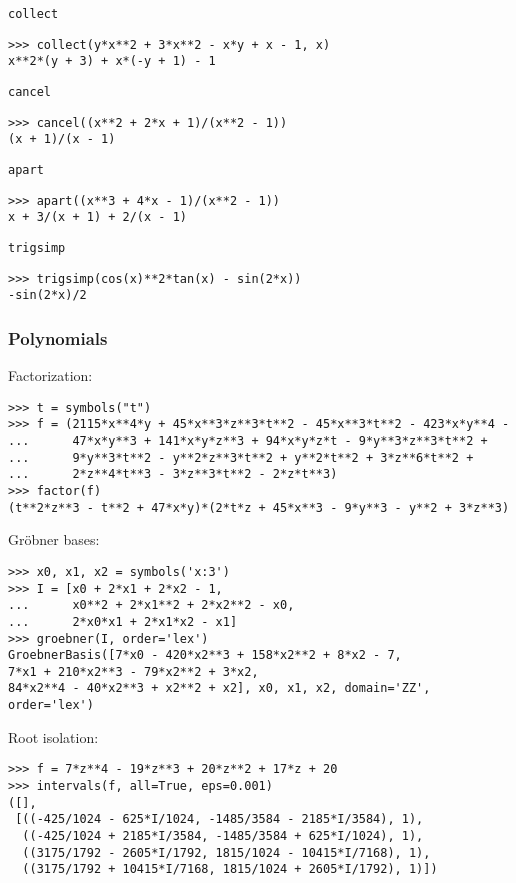 \noindent \texttt{collect}
\begin{verbatim}
>>> collect(y*x**2 + 3*x**2 - x*y + x - 1, x)
x**2*(y + 3) + x*(-y + 1) - 1
\end{verbatim}

\noindent \texttt{cancel}
\begin{verbatim}
>>> cancel((x**2 + 2*x + 1)/(x**2 - 1))
(x + 1)/(x - 1)
\end{verbatim}

\noindent \texttt{apart}
\begin{verbatim}
>>> apart((x**3 + 4*x - 1)/(x**2 - 1))
x + 3/(x + 1) + 2/(x - 1)
\end{verbatim}

\noindent \texttt{trigsimp}
\begin{verbatim}
>>> trigsimp(cos(x)**2*tan(x) - sin(2*x))
-sin(2*x)/2
\end{verbatim}


\subsubsection{Polynomials}
\noindent Factorization:
\begin{verbatim}
>>> t = symbols("t")
>>> f = (2115*x**4*y + 45*x**3*z**3*t**2 - 45*x**3*t**2 - 423*x*y**4 -
...      47*x*y**3 + 141*x*y*z**3 + 94*x*y*z*t - 9*y**3*z**3*t**2 +
...      9*y**3*t**2 - y**2*z**3*t**2 + y**2*t**2 + 3*z**6*t**2 +
...      2*z**4*t**3 - 3*z**3*t**2 - 2*z*t**3)
>>> factor(f)
(t**2*z**3 - t**2 + 47*x*y)*(2*t*z + 45*x**3 - 9*y**3 - y**2 + 3*z**3)
\end{verbatim}

\noindent Gr\"{o}bner bases:
\begin{verbatim}
>>> x0, x1, x2 = symbols('x:3')
>>> I = [x0 + 2*x1 + 2*x2 - 1,
...      x0**2 + 2*x1**2 + 2*x2**2 - x0,
...      2*x0*x1 + 2*x1*x2 - x1]
>>> groebner(I, order='lex')
GroebnerBasis([7*x0 - 420*x2**3 + 158*x2**2 + 8*x2 - 7,
7*x1 + 210*x2**3 - 79*x2**2 + 3*x2,
84*x2**4 - 40*x2**3 + x2**2 + x2], x0, x1, x2, domain='ZZ', order='lex')
\end{verbatim}

\noindent Root isolation:
\begin{verbatim}
>>> f = 7*z**4 - 19*z**3 + 20*z**2 + 17*z + 20
>>> intervals(f, all=True, eps=0.001)
([],
 [((-425/1024 - 625*I/1024, -1485/3584 - 2185*I/3584), 1),
  ((-425/1024 + 2185*I/3584, -1485/3584 + 625*I/1024), 1),
  ((3175/1792 - 2605*I/1792, 1815/1024 - 10415*I/7168), 1),
  ((3175/1792 + 10415*I/7168, 1815/1024 + 2605*I/1792), 1)])
\end{verbatim}

